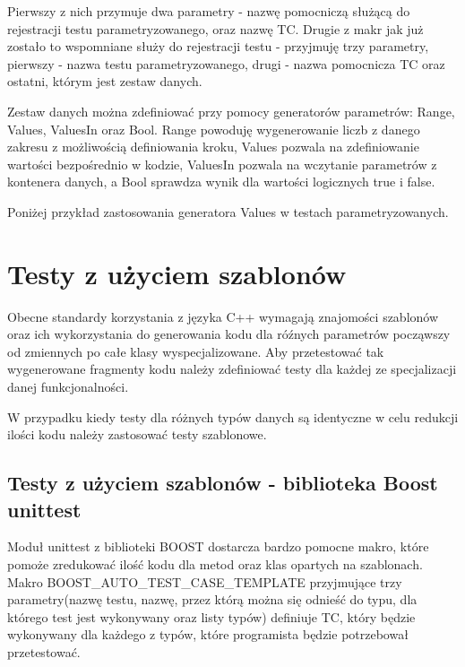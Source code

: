 \documentclass[12pt,a4paper,notitlepage]{report}
\begin{document}
Pierwszy z nich przymuje dwa parametry - nazwę pomocniczą służącą do rejestracji testu parametryzowanego, oraz nazwę TC. Drugie z makr jak już zostało to wspomniane służy do rejestracji testu  - przyjmuję trzy parametry, pierwszy - nazwa testu parametryzowanego, drugi - nazwa pomocnicza TC oraz ostatni, którym jest zestaw danych.

Zestaw danych można zdefiniować przy pomocy generatorów parametrów: Range, Values, ValuesIn oraz Bool. Range powoduję wygenerowanie liczb z danego zakresu z możliwością definiowania kroku, Values pozwala na zdefiniowanie wartości bezpośrednio w kodzie, ValuesIn pozwala na wczytanie parametrów z kontenera danych, a Bool sprawdza wynik dla wartości logicznych true i false.

Poniżej przykład zastosowania generatora Values w testach parametryzowanych.

			

\chapter{Testy z użyciem szablonów}

Obecne standardy korzystania z języka C++ wymagają znajomości szablonów oraz ich wykorzystania do generowania kodu dla róźnych parametrów począwszy od zmiennych po całe klasy wyspecjalizowane. Aby przetestować tak wygenerowane fragmenty kodu należy zdefiniować testy dla każdej ze specjalizacji danej funkcjonalności.

W przypadku kiedy testy dla różnych typów danych są identyczne w celu redukcji ilości kodu należy zastosować testy szablonowe.

\section{Testy z użyciem szablonów - biblioteka Boost unittest}

Moduł unittest z biblioteki BOOST dostarcza bardzo pomocne makro, które pomoże zredukować ilość kodu dla metod oraz klas opartych na szablonach. Makro BOOST{\_}AUTO{\_}TEST{\_}CASE{\_}TEMPLATE przyjmujące trzy parametry(nazwę testu, nazwę, przez którą można się odnieść do typu, dla którego test jest wykonywany oraz listy typów) definiuje TC, który będzie wykonywany dla każdego z typów, które programista będzie potrzebował przetestować.
\end{document}
